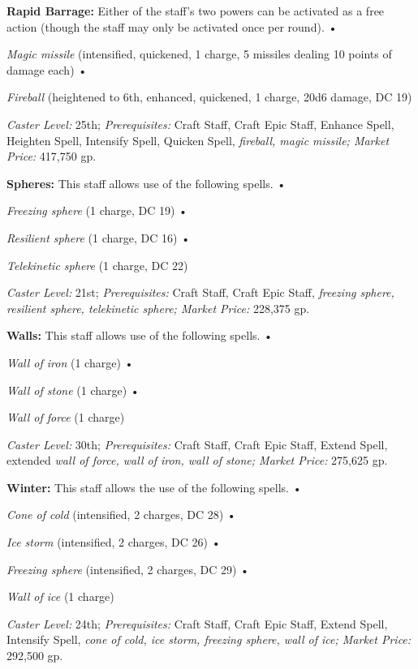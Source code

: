 \documentclass{article}
\begin{document}
\textbf{Rapid Barrage: }Either of the staff's two powers can be activated as a 
free action (though the staff may only be activated once per round). • 

\textit{Magic missile }(intensified, quickened, 1 charge, 5 missiles dealing 10 
points of damage each) • 

\textit{Fireball }(heightened to 6th, enhanced, quickened, 1 charge, 20d6 damage, 
DC 19) 

\textit{Caster Level: }25th; \textit{Prerequisites: }Craft Staff, Craft Epic Staff, 
Enhance Spell, Heighten Spell, Intensify Spell, Quicken Spell, \textit{fireball, 
magic missile; Market Price: }417,750 gp. 

\textbf{Spheres: }This staff allows use of the following spells. • 

\parindent=3pt
\textit{Freezing sphere }(1 charge, DC 19) • 

\textit{Resilient sphere }(1 charge, DC 16) • 

\textit{Telekinetic sphere }(1 charge, DC 22) 

\parindent=0pt
\textit{Caster Level: }21st; \textit{Prerequisites: }Craft Staff, Craft Epic Staff, 
\textit{freezing sphere, resilient sphere, telekinetic sphere; Market Price: }228,375 
gp. 

\textbf{Walls: }This staff allows use of the following spells. • 

\parindent=3pt
\textit{Wall of iron }(1 charge) • 

\textit{Wall of stone }(1 charge) • 

\textit{Wall of force }(1 charge) 

\parindent=0pt
\textit{Caster Level: }30th; \textit{Prerequisites: }Craft Staff, Craft Epic Staff, 
Extend Spell, extended \textit{wall of force, wall of iron, wall of stone; Market 
Price: }275,625 gp. 

\textbf{Winter: }This staff allows the use of the following spells. • 

\parindent=3pt
\textit{Cone of cold }(intensified, 2 charges, DC 28) • 

\textit{Ice storm }(intensified, 2 charges, DC 26) • 

\textit{Freezing sphere }(intensified, 2 charges, DC 29) • 

\textit{Wall of ice }(1 charge) 

\parindent=0pt
\textit{Caster Level: }24th; \textit{Prerequisites: }Craft Staff, Craft Epic Staff, 
Extend Spell, Intensify Spell, \textit{cone of cold, ice storm, freezing sphere, 
wall of ice; Market Price: }292,500 gp. 
\end{document}
